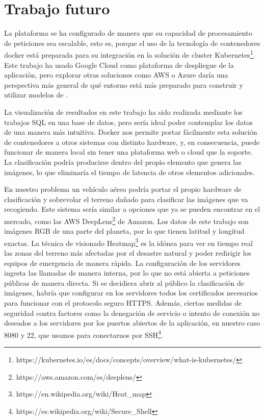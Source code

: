 \section{Trabajo futuro}\label{sec:trabajo-futuro}
La plataforma se ha configurado de manera que su capacidad de procesamiento de peticiones sea escalable, esto es, porque el uso de la tecnología de contenedores docker está preparada para su integración en la solución de cluster Kubernetes\footnote{https://kubernetes.io/es/docs/concepts/overview/what-is-kubernetes/}.
Este trabajo ha usado Google Cloud como plataforma de despliegue de la aplicación, pero explorar otras soluciones como AWS o Azure daría una perspectiva más general de qué entorno está más preparado para construir y utilizar modelos de .

La visualización de resultados en este trabajo ha sido realizada mediante los trabajos SQL en una base de datos, pero sería ideal poder contemplar los datos de una manera más intuitiva.
Docker nos permite portar fácilmente esta solución de contenedores a otros sistemas con distinto hardware, y, en consecuencia, puede funcionar de manera local sin tener una plataforma web o cloud que la soporte.
La clasificación podría producirse dentro del propio elemento que genera las imágenes, lo que eliminaría el tiempo de latencia de otros elementos adicionales.

En nuestro problema un vehículo aéreo podría portar el propio hardware de clasificación y sobrevolar el terreno dañado para clasificar las imágenes que va recogiendo.
Este sistema sería similar a opciones que ya se pueden encontrar en el mercado, como las AWS DeepLens\footnote{https://aws.amazon.com/es/deeplens/} de Amazon.
Los datos de este trabajo son imágenes RGB de una parte del planeta, por lo que tienen latitud y longitud exactas.
La técnica de visionado Heatmap\footnote{https://en.wikipedia.org/wiki/Heat\_map} es la idónea para ver en tiempo real las zonas del terreno más afectadas por el desastre natural y poder redirigir los equipos de emergencia de manera rápida.
La configuración de los servidores ingesta las llamadas de manera interna, por lo que no está abierta a peticiones públicas de manera directa.
Si se decidiera abrir al público la clasificación de imágenes, habría que configurar en los servidores todos los certificados necesarios para funcionar con el protocolo seguro HTTPS. Además, ciertas medidas de seguridad contra factores como la denegación de servicio o intento de conexión no deseados a los servidores por los puertos abiertos de la aplicación, en nuestro caso 8080 y 22, que usamos para conectarnos por SSH\footnote{https://es.wikipedia.org/wiki/Secure\_Shell}.